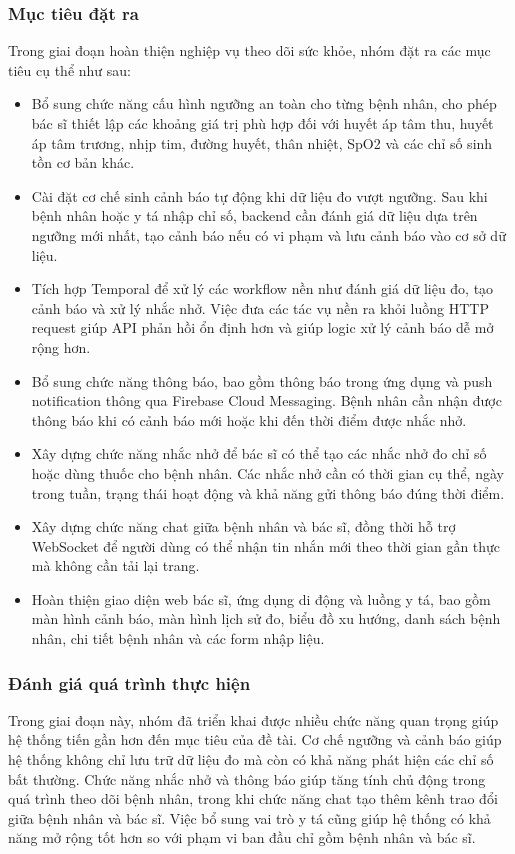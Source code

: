 \subsubsection{Mục tiêu đặt ra}
\par Trong giai đoạn hoàn thiện nghiệp vụ theo dõi sức khỏe, nhóm đặt ra các mục tiêu cụ thể như sau:
\begin{itemize}
    \item Bổ sung chức năng cấu hình ngưỡng an toàn cho từng bệnh nhân, cho phép bác sĩ thiết lập các khoảng giá trị phù hợp đối với huyết áp tâm thu, huyết áp tâm trương, nhịp tim, đường huyết, thân nhiệt, SpO2 và các chỉ số sinh tồn cơ bản khác.
    \item Cài đặt cơ chế sinh cảnh báo tự động khi dữ liệu đo vượt ngưỡng. Sau khi bệnh nhân hoặc y tá nhập chỉ số, backend cần đánh giá dữ liệu dựa trên ngưỡng mới nhất, tạo cảnh báo nếu có vi phạm và lưu cảnh báo vào cơ sở dữ liệu.
    \item Tích hợp Temporal để xử lý các workflow nền như đánh giá dữ liệu đo, tạo cảnh báo và xử lý nhắc nhở. Việc đưa các tác vụ nền ra khỏi luồng HTTP request giúp API phản hồi ổn định hơn và giúp logic xử lý cảnh báo dễ mở rộng hơn.
    \item Bổ sung chức năng thông báo, bao gồm thông báo trong ứng dụng và push notification thông qua Firebase Cloud Messaging. Bệnh nhân cần nhận được thông báo khi có cảnh báo mới hoặc khi đến thời điểm được nhắc nhở.
    \item Xây dựng chức năng nhắc nhở để bác sĩ có thể tạo các nhắc nhở đo chỉ số hoặc dùng thuốc cho bệnh nhân. Các nhắc nhở cần có thời gian cụ thể, ngày trong tuần, trạng thái hoạt động và khả năng gửi thông báo đúng thời điểm.
    \item Xây dựng chức năng chat giữa bệnh nhân và bác sĩ, đồng thời hỗ trợ WebSocket để người dùng có thể nhận tin nhắn mới theo thời gian gần thực mà không cần tải lại trang.
    \item Hoàn thiện giao diện web bác sĩ, ứng dụng di động và luồng y tá, bao gồm màn hình cảnh báo, màn hình lịch sử đo, biểu đồ xu hướng, danh sách bệnh nhân, chi tiết bệnh nhân và các form nhập liệu.
\end{itemize}

\subsubsection{Đánh giá quá trình thực hiện}
\par Trong giai đoạn này, nhóm đã triển khai được nhiều chức năng quan trọng giúp hệ thống tiến gần hơn đến mục tiêu của đề tài. Cơ chế ngưỡng và cảnh báo giúp hệ thống không chỉ lưu trữ dữ liệu đo mà còn có khả năng phát hiện các chỉ số bất thường. Chức năng nhắc nhở và thông báo giúp tăng tính chủ động trong quá trình theo dõi bệnh nhân, trong khi chức năng chat tạo thêm kênh trao đổi giữa bệnh nhân và bác sĩ. Việc bổ sung vai trò y tá cũng giúp hệ thống có khả năng mở rộng tốt hơn so với phạm vi ban đầu chỉ gồm bệnh nhân và bác sĩ.

